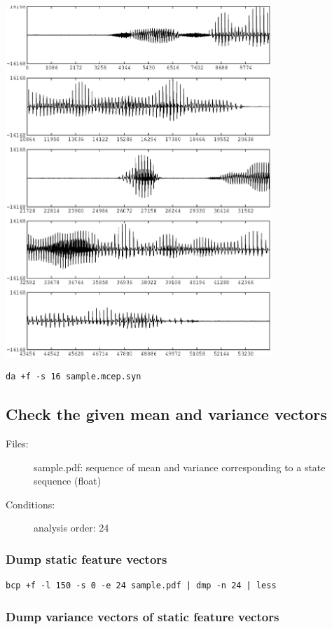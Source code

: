 \documentclass[a4paper,10pt]{article}
\begin{document}
\includegraphics[width=10cm]{eps/sample.mcep.syn.gwave.eps}

\begin{verbatim}
da +f -s 16 sample.mcep.syn
\end{verbatim}

\subsection{Check the given mean and variance vectors}

\begin{description}
\item[Files:]
  sample.pdf: sequence of mean and variance
              corresponding to a state sequence (float)
\item[Conditions:]
  analysis order: 24
\end{description}

\subsubsection{Dump static feature vectors}

\begin{verbatim}
bcp +f -l 150 -s 0 -e 24 sample.pdf | dmp -n 24 | less
\end{verbatim}

\subsubsection{Dump variance vectors of static feature vectors}
\end{document}

